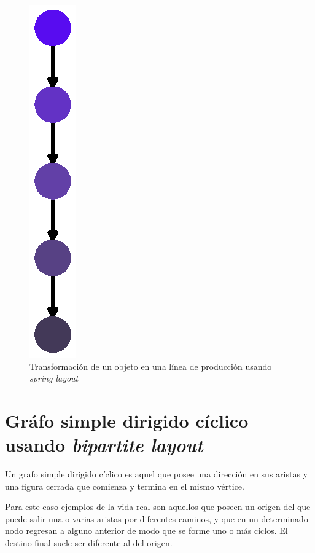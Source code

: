 \documentclass{article}
\begin{document}
\begin{figure}[htbp]
    \centering
    \includegraphics[scale=0.6]{imagenes1/Fig04.eps}
    \caption{Transformación de un objeto en una línea de producción usando \textit{spring layout} }
    \label{fig:Fig04}
\end{figure}


\section{Gráfo simple dirigido cíclico usando \textit{bipartite layout} }

Un grafo simple dirigido cíclico es aquel que posee una dirección en sus aristas y una figura cerrada que comienza y  termina en el mismo vértice.

Para este caso ejemplos de la vida real son aquellos que poseen un origen del que puede salir una o varias aristas por diferentes caminos, y que en un determinado nodo regresan a alguno anterior de modo que se forme uno o más ciclos. El destino final suele ser diferente al del origen. 
\end{document}
